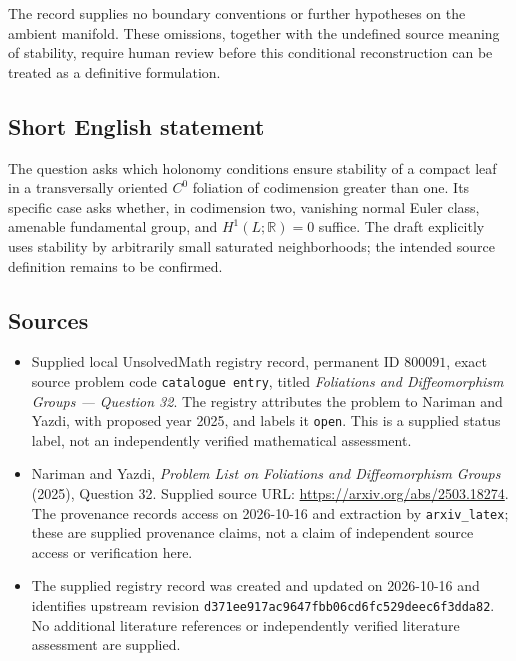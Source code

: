 \documentclass[11pt]{article}
\newcommand{\R}{\mathbb{R}}
\begin{document}
The record supplies no boundary conventions or further hypotheses on the ambient manifold. These omissions, together with the undefined source meaning of stability, require human review before this conditional reconstruction can be treated as a definitive formulation.
\subsection{Short English statement}
The question asks which holonomy conditions ensure stability of a compact leaf in a transversally oriented \(C^0\) foliation of codimension greater than one. Its specific case asks whether, in codimension two, vanishing normal Euler class, amenable fundamental group, and \(H^1(L;\R)=0\) suffice. The draft explicitly uses stability by arbitrarily small saturated neighborhoods; the intended source definition remains to be confirmed.
\subsection{Sources}
\begin{itemize}
\item Supplied local UnsolvedMath registry record, permanent ID \(800091\), exact source problem code \texttt{catalogue entry}, titled \emph{Foliations and Diffeomorphism Groups --- Question 32}. The registry attributes the problem to Nariman and Yazdi, with proposed year 2025, and labels it \texttt{open}. This is a supplied status label, not an independently verified mathematical assessment.
\item Nariman and Yazdi, \emph{Problem List on Foliations and Diffeomorphism Groups} (2025), Question 32. Supplied source URL: \url{https://arxiv.org/abs/2503.18274}. The provenance records access on 2026-10-16 and extraction by \texttt{arxiv\_latex}; these are supplied provenance claims, not a claim of independent source access or verification here.
\item The supplied registry record was created and updated on 2026-10-16 and identifies upstream revision \texttt{d371ee917ac9647fbb06cd6fc529deec6f3dda82}. No additional literature references or independently verified literature assessment are supplied.
\end{itemize}
\end{document}
